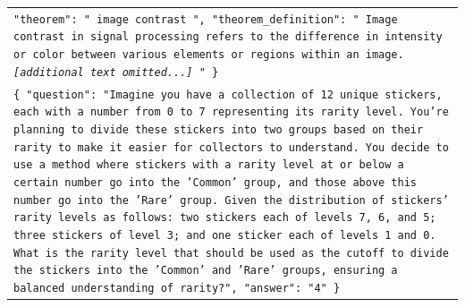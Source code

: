 \begin{table}[!th]
\begin{tabular}{>{\raggedright\arraybackslash\tt}p{}<{}}
                "theorem": "{\color{blue} image contrast }",
                "theorem\_definition": "{\color{blue} Image contrast in signal processing refers to the difference in intensity or color between various elements or regions within an image. \textit{[additional text omitted...]} }"
            \}
            \\
            {\color{violet}\{
                "question": "Imagine you have a collection of 12 unique stickers, each with a number from 0 to 7 representing its rarity level. You're planning to divide these stickers into two groups based on their rarity to make it easier for collectors to understand. You decide to use a method where stickers with a rarity level at or below a certain number go into the 'Common' group, and those above this number go into the 'Rare' group. Given the distribution of stickers' rarity levels as follows: two stickers each of levels 7, 6, and 5; three stickers of level 3; and one sticker each of levels 1 and 0. What is the rarity level that should be used as the cutoff to divide the stickers into the 'Common' and 'Rare' groups, ensuring a balanced understanding of rarity?",
                "answer": "4"
            \}}
            \\
        \bottomrule
    \end{tabular}
\end{table}
